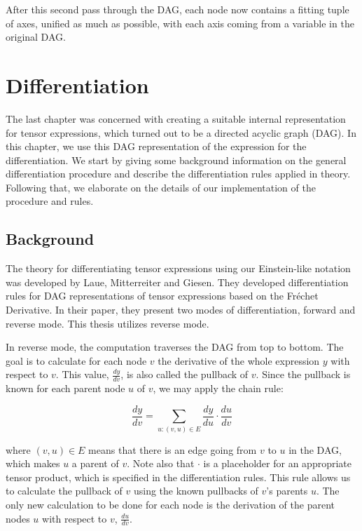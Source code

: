\documentclass[12pt, a4paper]{report}
\begin{document}
After this second pass through the DAG, each node now contains a fitting tuple of axes, unified as much as possible, with each axis coming from a variable in the original DAG.

\FloatBarrier
\chapter{Differentiation}
The last chapter was concerned with creating a suitable internal representation for tensor expressions, which turned out to be a directed acyclic graph (DAG).
In this chapter, we use this DAG representation of the expression for the differentiation.
We start by giving some background information on the general differentiation procedure and describe the differentiation rules applied in theory.
Following that, we elaborate on the details of our implementation of the procedure and rules.

\section{Background}
The theory for differentiating tensor expressions using our Einstein-like notation was developed by Laue, Mitterreiter and Giesen.
They developed differentiation rules for DAG representations of tensor expressions based on the Fr\'{e}chet Derivative.
In their paper, they present two modes of differentiation, forward and reverse mode.
This thesis utilizes reverse mode. %

In reverse mode, the computation traverses the DAG from top to bottom.
The goal is to calculate for each node $v$ the derivative of the whole expression $y$ with respect to $v$.
This value, $\frac{dy}{dv}$, is also called the pullback of $v$.
Since the pullback is known for each parent node $u$ of $v$, we may apply the chain rule:

\begin{equation}
    \frac{dy}{dv} = \sum_{u: (v,u) \in E} \frac{dy}{du} \cdot \frac{du}{dv}
    \label{eq:diff}
\end{equation}

where $(v,u) \in E$ means that there is an edge going from $v$ to $u$ in the DAG, which makes $u$ a parent of $v$. 
Note also that $\cdot$ is a placeholder for an appropriate tensor product, which is specified in the differentiation rules. 
This rule allows us to calculate the pullback of $v$ using the known pullbacks of $v$'s parents $u$.
The only new calculation to be done for each node is the derivation of the parent nodes $u$ with respect to $v$, $\frac{du}{dv}$.
\end{document}
